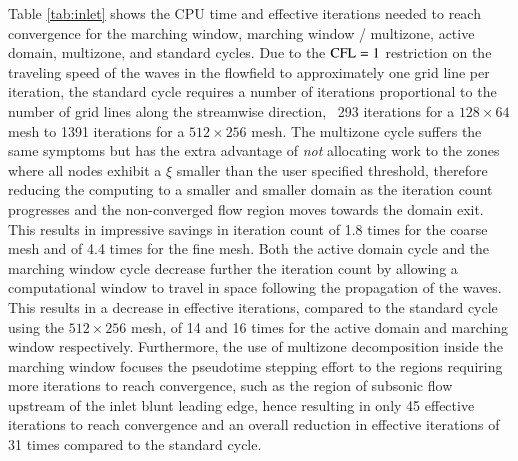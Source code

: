 Table \ref{tab:inlet} shows the CPU time and effective
iterations needed to reach convergence for the marching window,
marching window / multizone, active domain, multizone, and
standard cycles. Due to the ${\rm CFL}=1$ restriction  on the traveling speed
of the waves in the flowfield to approximately one grid line per iteration,
the standard cycle requires a number of iterations proportional to the
number of grid lines along the streamwise direction, \ie\ 293 iterations
for a $128 \times 64$ mesh to 1391 iterations for a $512 \times 256$ mesh. The multizone
cycle suffers the same symptoms but has the extra advantage of \emph{not} allocating
work to the zones where all nodes exhibit a $\xi$ smaller than the user
specified threshold, therefore reducing the computing to a smaller and smaller domain
as the iteration count progresses and the non-converged flow region moves towards
the domain exit. This results in impressive savings in iteration count of
1.8 times for the coarse mesh and of 4.4 times for the fine mesh.
Both the active domain cycle and the marching window cycle decrease further the
iteration count by allowing a
computational window to travel in space following the propagation of the waves.
This results in a decrease in effective iterations, compared to the standard cycle
using the $512 \times 256$ mesh,
of 14 and 16 times for the active domain and marching window respectively.
Furthermore, the use of multizone decomposition inside the marching window
focuses the pseudotime stepping effort to the regions requiring more iterations
to reach convergence, such as the region of subsonic flow upstream of the
inlet blunt leading edge, hence resulting in only 45 effective iterations to
reach convergence and an overall reduction in effective iterations of
31 times compared to the standard cycle.
%
